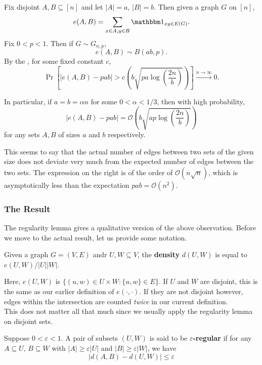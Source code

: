 \documentclass{article}
\begin{document}
			Fix disjoint $A, B \subseteq [n]$ and let $|A|=a$, $|B|=b$. Then given a graph $G$ on $[n]$,
			\[ e(A,B) = \sum_{x \in A, y \in B} \indic_{xy \in E(G)}. \]
			Fix $0<p<1$. Then if $G \sim G_{n,p}$,
			\[ e(A,B) \sim B\left( ab, p \right). \]
			By the , for some fixed constant $c$,
			\[ \Pr\left[ |e(A,B) - pab| > c \left(b\sqrt{pa\log\left(\frac{2n}{b}\right)}\right) \right] \xrightarrow{n\to\infty} 0. \]

			In particular, if $a = b = \alpha n$ for some $0 < \alpha < 1/3$, then with high probability,
			\[ |e(A,B) - pab| = \mathcal{O}\left(b\sqrt{ap\log\left(\frac{2n}{b}\right)}\right) \]
			for any sets $A, B$ of sizes $a$ and $b$ respectively.

			This seems to say that the actual number of edges between two sets of the given size does not deviate very much from the expected number of edges between the two sets. The expression on the right is of the order of $\mathcal{O}(n\sqrt{n})$, which is asymptotically less than the expectation $pab = \mathcal{O}(n^2)$.

		\subsubsection{The Result}

			The regularity lemma gives a qualitative version of the above observation. Before we move to the actual result, let us provide some notation.

			\begin{fdef}[Density]
				Given a graph $G = (V,E)$ andr $U,W \subseteq V$, the \textbf{density} $d(U,W)$ is equal to $e(U,W) / |U||W|$.
			\end{fdef}

			\begin{remark}
				Here, $e(U,W)$ is $\{(u,w) \in U \times W : \{u,w\} \in E\}$. If $U$ and $W$ are disjoint, this is the same as our earlier definition of $e(\cdot,\cdot)$. If they are not disjoint however, edges within the intersection are counted \emph{twice} in our current definition.\\
				This does not matter all that much since we usually apply the regularity lemma on disjoint sets.
			\end{remark}

			\begin{fdef}
				Suppose $0 < \varepsilon < 1$. A pair of subsets $(U,W)$ is said to be \textbf{$\varepsilon$-regular} if for any $A \subseteq U$, $B\subseteq W$ with $|A| \ge \varepsilon |U|$ and $|B| \ge \varepsilon |W|$, we have
				\[ |d(A,B) - d(U,W)| \le \varepsilon \]
			\end{fdef}
\end{document}
